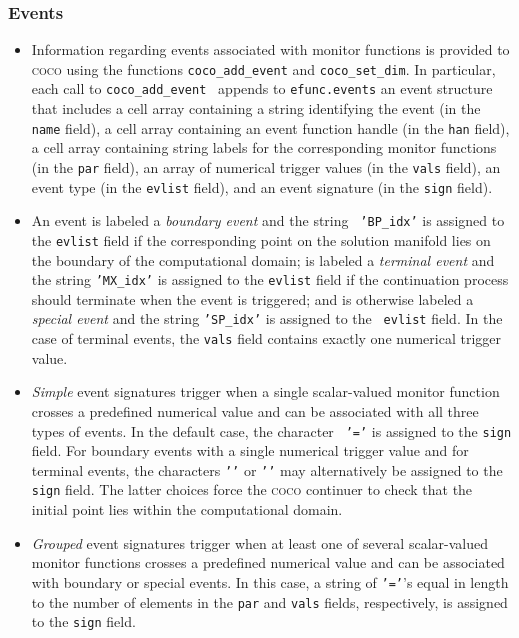 \documentclass{article}
\begin{document}
\subsubsection{Events}

\begin{itemize}
\item Information regarding events associated with monitor functions is
provided to \textsc{coco} using the functions \texttt{coco\_add\_event} and 
\texttt{coco\_set\_dim}. In particular, each call to \texttt{coco\_add\_event%
} appends to \texttt{efunc.events} an event structure that includes a cell
array containing a string identifying the event (in the \texttt{name}
field), a cell array containing an event function handle (in the \texttt{han}
field), a cell array containing string labels for the corresponding monitor
functions (in the \texttt{par} field), an array of numerical trigger values
(in the \texttt{vals} field), an event type (in the \texttt{evlist} field),
and an event signature (in the \texttt{sign} field).

\item An event is labeled a \emph{boundary event} and the string \texttt{%
'BP\_idx'} is assigned to the \texttt{evlist} field if the corresponding
point on the solution manifold lies on the boundary of the computational
domain; is labeled a \emph{terminal event} and the string \texttt{'MX\_idx'}
is assigned to the \texttt{evlist} field if the continuation process should
terminate when the event is triggered; and is otherwise labeled a \emph{%
special event} and the string \texttt{'SP\_idx'} is assigned to the \texttt{%
evlist} field. In the case of terminal events, the \texttt{vals} field
contains exactly one numerical trigger value.

\item \emph{Simple} event signatures trigger when a single scalar-valued
monitor function crosses a predefined numerical value and can be associated
with all three types of events. In the default case, the character \texttt{%
'='} is assigned to the \texttt{sign} field. For boundary events with a
single numerical trigger value and for terminal events, the characters 
\texttt{'\TEXTsymbol{<}'} or \texttt{'\TEXTsymbol{>}'} may alternatively be
assigned to the \texttt{sign} field. The latter choices force the \textsc{%
coco} continuer to check that the initial point lies within the
computational domain.

\item \emph{Grouped} event signatures trigger when at least one of several
scalar-valued monitor functions crosses a predefined numerical value and can
be associated with boundary or special events. In this case, a string of 
\texttt{'='}'s equal in length to the number of elements in the \texttt{par}
and \texttt{vals} fields, respectively, is assigned to the \texttt{sign}
field.


\end{itemize}
\end{document}
